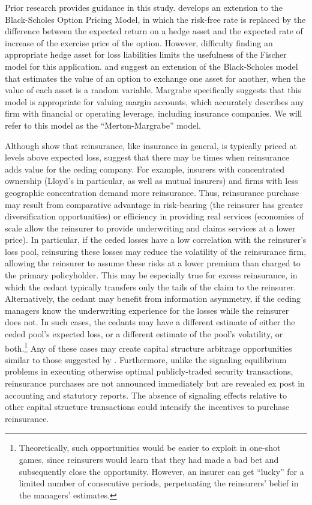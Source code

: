 Prior research provides guidance in this study. \citet{fischer1978a} develops an extension to the Black-Scholes Option Pricing Model, in which the risk-free rate is replaced by the difference between the expected return on a hedge asset and the expected rate of increase of the exercise price of the option. However, difficulty finding an appropriate hedge asset for loss liabilities limits the usefulness of the Fischer model for this application. \citet{merton1973a} and \citet{margrabe1978a} suggest an extension of the Black-Scholes model that estimates the value of an option to exchange one asset for another, when the value of each asset is a random variable. Margrabe specifically suggests that this model is appropriate for valuing margin accounts, which accurately describes any firm with financial or operating leverage, including insurance companies. We will refer to this model as the ``Merton-Margrabe'' model.

Although \citet{weiss2004a} show that reinsurance, like insurance in general, is typically priced at levels above expected loss, \citet{mayers1990a} suggest that there may be times when reinsurance adds value for the ceding company. For example, insurers with concentrated ownership (Lloyd's in particular, as well as mutual insurers) and firms with less geographic concentration demand more reinsurance.  Thus, reinsurance purchase may result from comparative advantage in risk-bearing (the reinsurer has greater diversification opportunities) or efficiency in providing real services (economies of scale allow the reinsurer to provide underwriting and claims services at a lower price).  In particular, if the ceded losses have a low correlation with the reinsurer's loss pool, reinsuring these losses may reduce the volatility of the reinsurance firm, allowing the reinsurer to assume these risks at a lower premium than charged to the primary policyholder. This may be especially true for excess reinsurance, in which the cedant typically transfers only the tails of the claim to the reinsurer. Alternatively, the cedant may benefit from information asymmetry, if the ceding managers know the underwriting experience for the losses while the reinsurer does not. In such cases, the cedants may have a different estimate of either the ceded pool's expected loss, or a different estimate of the pool's volatility, or both.\footnote{Theoretically, such opportunities would be easier to exploit in one-shot games, since reinsurers would learn that they had made a bad bet and subsequently close the opportunity.  However, an insurer can get ``lucky'' for a limited number of consecutive periods, perpetuating the reinsurers' belief in the managers' estimates.} Any of these cases may create capital structure arbitrage opportunities similar to those suggested by \citet{obrien2007a}. Furthermore, unlike the signaling equilibrium problems in executing otherwise optimal publicly-traded security transactions, reinsurance purchases are not announced immediately but are revealed ex post in accounting and statutory reports. The absence of signaling effects relative to other capital structure transactions could intensify the incentives to purchase reinsurance.

